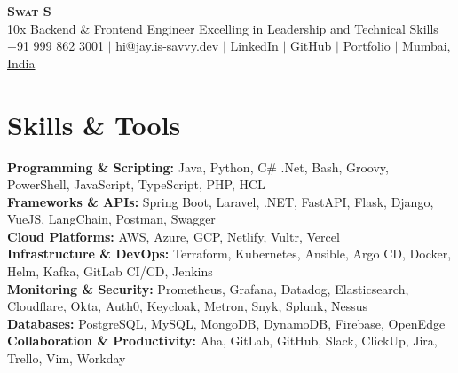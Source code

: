 \documentclass[letterpaper,11pt]{article}
\newcommand{\resumeSubHeadingListStart}{\begin{itemize}[leftmargin=0.15in, label={}]}
\newcommand{\resumeSubHeadingListEnd}{\end{itemize}}
\begin{document}

\begin{center}
  \textbf{\Huge \scshape Swat S} \\ \vspace{3pt}
  \normalsize 10x Backend \& Frontend Engineer Excelling in Leadership and Technical Skills \\ \vspace{3pt}
  \small
  \faMobile \hspace{.5pt} \href{tel:919998623001}{+91 999 862 3001}
  $|$
  \faAt \hspace{.5pt} \href{mailto:hi@jay.is-savvy.dev}{hi@jay.is-savvy.dev}
  $|$
  \faLinkedinSquare \hspace{.5pt} \href{https://www.linkedin.com/in/jbhv12/}{LinkedIn}
  $|$
  \faGithub \hspace{.5pt} \href{https://github.com/jbhv12}{GitHub}
  $|$
  \faGlobe \hspace{.5pt} \href{https://jay.is-savvy.dev/}{Portfolio}
  $|$
  \faMapMarker \hspace{.5pt} \href{https://goo.gl/maps/Czh1vXePukiKumpu5}{Mumbai, India}
\end{center}


\section{Skills \& Tools}
\vspace{2pt}
\resumeSubHeadingListStart
\small{\item{
              \textbf{Programming \& Scripting:}{ Java, Python, C\# .Net, Bash, Groovy, PowerShell, JavaScript, TypeScript, PHP, HCL} \\ \vspace{3pt}
              \textbf{Frameworks \& APIs:}{ Spring Boot, Laravel, .NET, FastAPI, Flask, Django, VueJS, LangChain, Postman, Swagger} \\ \vspace{3pt}
              \textbf{Cloud Platforms:}{ AWS, Azure, GCP, Netlify, Vultr, Vercel} \\ \vspace{3pt}
              \textbf{Infrastructure \& DevOps:}{ Terraform, Kubernetes, Ansible, Argo CD, Docker, Helm, Kafka, GitLab CI/CD, Jenkins} \\ \vspace{3pt}
              \textbf{Monitoring \& Security:}{ Prometheus, Grafana, Datadog, Elasticsearch, Cloudflare, Okta, Auth0, Keycloak, Metron, Snyk, Splunk, Nessus} \\ \vspace{3pt}
              \textbf{Databases:}{ PostgreSQL, MySQL, MongoDB, DynamoDB, Firebase, OpenEdge} \\ \vspace{3pt}
              \textbf{Collaboration \& Productivity:}{ Aha, GitLab, GitHub, Slack, ClickUp, Jira, Trello, Vim, Workday} \\ \vspace{3pt}
            }}
\resumeSubHeadingListEnd
\end{document}
